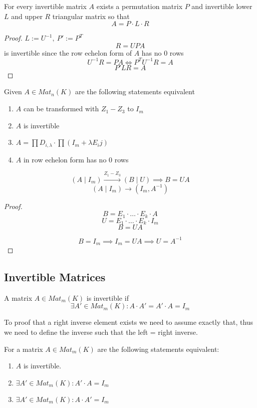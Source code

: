 \begin{theorem}[LU-Decomposition]
   For every invertible matrix \(A\) exists a permutation matrix \(P\) and invertible lower \(L\) and upper \(R\) triangular matrix so that
   \[A = P \cdot L \cdot R\]
\end{theorem}
\begin{proof}
   \(L := U^{-1},~P' := P^T\)
   \[R = UPA\]
   is invertible since the row echelon form of \(A\) has no 0 rows
   \[U^{-1} R = PA \iff P^T U^{-1} R = A\]
   \[P'LR = A\]
\end{proof}

\begin{theorem}
   Given \(A \in Mat_n(K)\) are the following statements equivalent
   \begin{enumerate}
      \item \(A\) can be transformed with \(Z_1 - Z_3\) to \(I_m\)
      \item \(A\) is invertible
      \item \(A = \prod D_{i,\lambda} \cdot \prod (I_m + \lambda E_ij)\)
      \item \(A\) in row echelon form has no 0 rows
   \end{enumerate}
\end{theorem}

\begin{theorem}
   \[(A \mid I_m) \xrightarrow{Z_1 - Z_3} (B \mid U) \implies B = UA\]
   \[(A \mid I_m) \rightarrow (I_m, A^{-1})\]
\end{theorem}
\begin{proof}
   \[B = E_1 \cdot \ldots \cdot E_k \cdot A\]
   \[U = E_1 \cdot \ldots \cdot E_k \cdot I_m\]
   \[B = UA\]

   \[B = I_m \implies I_m = UA \implies U = A^{-1}\]
\end{proof}

\subsection{Invertible Matrices}
\begin{definition}
   A matrix \(A \in Mat_m(K)\) is invertible if
   \[\exists A' \in Mat_m(K): A \cdot A' = A' \cdot A = I_m\]
\end{definition}
\begin{remark}
   To proof that a right inverse element exists we need to assume exactly that, thus we need to define the inverse such that the left = right inverse.

   For a matrix \(A \in Mat_m(K)\) are the following statements equivalent:
   \begin{enumerate}
      \item \(A\) is invertible.
      \item \(\exists A' \in Mat_m(K): A' \cdot A = I_m\)
      \item \(\exists A' \in Mat_m(K): A \cdot A' = I_m\)
   \end{enumerate}
\end{remark}

